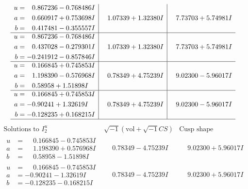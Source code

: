 \documentclass[1p]{elsarticle_modified}
\theoremstyle{definition}
\newcommand{\I}{\sqrt{-1}}
\begin{document}
$$\begin{array}{c|c|c}
\begin{aligned}
u &= \phantom{-}0.867236 - 0.768486 I \\
a &= \phantom{-}0.660917 + 0.753698 I \\
b &= \phantom{-}0.417481 - 0.355557 I\end{aligned}
 & \phantom{-}1.07339 + 1.32380 I & \phantom{-}7.73703 + 5.74981 I \\ \hline\begin{aligned}
u &= \phantom{-}0.867236 - 0.768486 I \\
a &= \phantom{-}0.437028 - 0.279301 I \\
b &= -0.241912 - 0.857846 I\end{aligned}
 & \phantom{-}1.07339 + 1.32380 I & \phantom{-}7.73703 + 5.74981 I \\ \hline\begin{aligned}
u &= \phantom{-}0.166845 + 0.745853 I \\
a &= \phantom{-}1.198390 - 0.576968 I \\
b &= \phantom{-}0.58958 + 1.51898 I\end{aligned}
 & \phantom{-}0.78349 + 4.75239 I & \phantom{-}9.02300 - 5.96017 I \\ \hline\begin{aligned}
u &= \phantom{-}0.166845 + 0.745853 I \\
a &= -0.90241 + 1.32619 I \\
b &= -0.128235 + 0.168215 I\end{aligned}
 & \phantom{-}0.78349 + 4.75239 I & \phantom{-}9.02300 - 5.96017 I\\
 \hline 
 \end{array}$$\newpage$$\begin{array}{c|c|c}  
\text{Solutions to }I^u_{2}& \I (\text{vol} + \sqrt{-1}CS) & \text{Cusp shape}\\
 \hline 
\begin{aligned}
u &= \phantom{-}0.166845 - 0.745853 I \\
a &= \phantom{-}1.198390 + 0.576968 I \\
b &= \phantom{-}0.58958 - 1.51898 I\end{aligned}
 & \phantom{-}0.78349 - 4.75239 I & \phantom{-}9.02300 + 5.96017 I \\ \hline\begin{aligned}
u &= \phantom{-}0.166845 - 0.745853 I \\
a &= -0.90241 - 1.32619 I \\
b &= -0.128235 - 0.168215 I\end{aligned}
 & \phantom{-}0.78349 - 4.75239 I & \phantom{-}9.02300 + 5.96017 I \\ \hline\begin{aligned}

\end{aligned}
\end{array}$$
\end{document}

